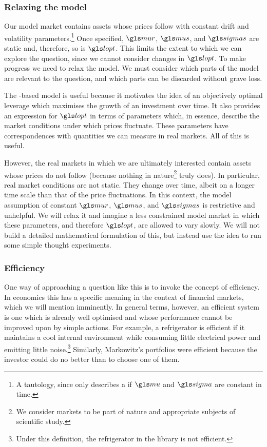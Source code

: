 \subsubsection{Relaxing the model}
Our model market contains assets whose prices follow \GBM with constant drift and volatility parameters.\footnote{A tautology, since  only describes a \GBM if $\gmu$ and $\gsigma$ are constant in time.} Once specified, $\mur$, $\mus$, and $\sigmas$ are static and, therefore, so is $\lopt$. This limits the extent to which we can explore the question, since we cannot consider changes in $\lopt$. To make progress we need to relax the model. We must consider which parts of the model are relevant to the question, and which parts can be discarded without grave loss.

The \GBM-based model is useful because it motivates the idea of an objectively optimal leverage which maximises the growth of an investment over time. It also provides an expression for $\lopt$ in terms of parameters which, in essence, describe the market conditions under which prices fluctuate. These parameters have correspondences with quantities we can measure in real markets. All of this is useful.

However, the real markets in which we are ultimately interested contain assets whose prices do not follow \GBM (because nothing in nature\footnote{We consider markets to be part of nature and appropriate subjects of scientific study.} truly does). In particular, real market conditions are not static. They change over time, albeit on a longer time scale than that of the price fluctuations. In this context, the model assumption of constant $\mur$, $\mus$, and $\sigmas$ is restrictive and unhelpful. We will relax it and imagine a less constrained model market in which these parameters, and therefore $\lopt$, are allowed to vary slowly. We will not build a detailed mathematical formulation of this, but instead use the idea to run some simple thought experiments.

\subsubsection{Efficiency}
One way of approaching a question like this is to invoke the concept of efficiency. In economics this has a specific meaning in the context of financial markets, which we will mention imminently. In general terms, however, an efficient system is one which is already well optimised and whose performance cannot be improved upon by simple actions. For example, a refrigerator is efficient if it maintains a cool internal environment while consuming little electrical power and emitting little noise.\footnote{Under this definition, the refrigerator in the \LML library is not efficient.} Similarly, Markowitz's portfolios were efficient because the investor could do no better than to choose one of them. 


